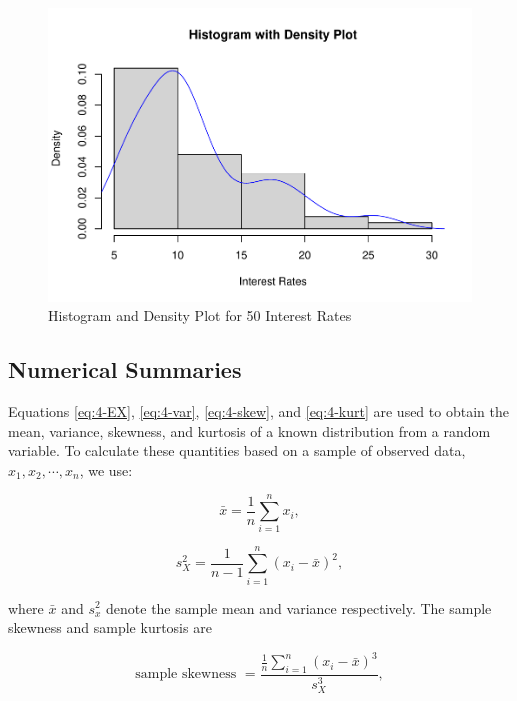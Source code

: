\documentclass[
]{book}
\begin{document}
\begin{figure}
\centering
\includegraphics{bookdown-demo_files/figure-latex/4-R3-1.pdf}
\caption{\label{fig:4-R3}Histogram and Density Plot for 50 Interest Rates}
\end{figure}

\subsection{Numerical Summaries}\label{numerical-summaries}

Equations \eqref{eq:4-EX}, \eqref{eq:4-var}, \eqref{eq:4-skew}, and \eqref{eq:4-kurt} are used to obtain the mean, variance, skewness, and kurtosis of a known distribution from a random variable. To calculate these quantities based on a sample of observed data, \(x_1, x_2, \cdots, x_n\), we use:

\begin{equation} 
\bar{x} =  \frac{1}{n} \sum_{i=1}^n x_i,
\label{eq:4-xbar}
\end{equation}

\begin{equation} 
s_X^2 =  \frac{1}{n-1} \sum_{i=1}^n (x_i - \bar{x})^2,
\label{eq:4-sampvar}
\end{equation}

where \(\bar{x}\) and \(s_x^2\) denote the sample mean and variance respectively. The sample skewness and sample kurtosis are

\begin{equation} 
\text{sample skewness } =  \frac{\frac{1}{n} \sum_{i=1}^n (x_i - \bar{x})^3}{s_X^3},
\label{eq:4-sampskew}
\end{equation}
\end{document}
